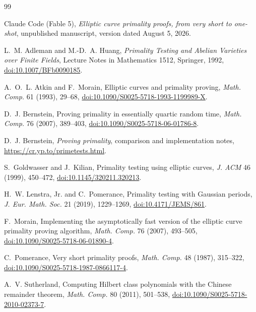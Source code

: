\documentclass[11pt]{amsart}
\begin{document}
\begin{thebibliography}{99}

Claude Code (Fable 5), \emph{Elliptic curve primality proofs, from very short to one-shot}, unpublished manuscript, version dated August 5, 2026.

L.~M. Adleman and M.-D.~A. Huang,
\emph{Primality Testing and Abelian Varieties over Finite Fields},
Lecture Notes in Mathematics 1512, Springer, 1992,
\href{https://doi.org/10.1007/BFb0090185}{doi:10.1007/BFb0090185}.

A.~O.~L. Atkin and F.~Morain,
Elliptic curves and primality proving,
\emph{Math. Comp.} 61 (1993), 29--68,
\href{https://doi.org/10.1090/S0025-5718-1993-1199989-X}{doi:10.1090/S0025-5718-1993-1199989-X}.

D.~J. Bernstein,
Proving primality in essentially quartic random time,
\emph{Math. Comp.} 76 (2007), 389--403,
\href{https://doi.org/10.1090/S0025-5718-06-01786-8}{doi:10.1090/S0025-5718-06-01786-8}.

D.~J. Bernstein,
\emph{Proving primality}, comparison and implementation notes,
\href{https://cr.yp.to/primetests.html}{https://cr.yp.to/primetests.html}.

S.~Goldwasser and J.~Kilian,
Primality testing using elliptic curves,
\emph{J. ACM} 46 (1999), 450--472,
\href{https://doi.org/10.1145/320211.320213}{doi:10.1145/320211.320213}.

H.~W. Lenstra, Jr. and C.~Pomerance,
Primality testing with Gaussian periods,
\emph{J. Eur. Math. Soc.} 21 (2019), 1229--1269,
\href{https://doi.org/10.4171/JEMS/861}{doi:10.4171/JEMS/861}.

F.~Morain,
Implementing the asymptotically fast version of the elliptic curve primality proving algorithm,
\emph{Math. Comp.} 76 (2007), 493--505,
\href{https://doi.org/10.1090/S0025-5718-06-01890-4}{doi:10.1090/S0025-5718-06-01890-4}.

C.~Pomerance,
Very short primality proofs,
\emph{Math. Comp.} 48 (1987), 315--322,
\href{https://doi.org/10.1090/S0025-5718-1987-0866117-4}{doi:10.1090/S0025-5718-1987-0866117-4}.

A.~V. Sutherland,
Computing Hilbert class polynomials with the Chinese remainder theorem,
\emph{Math. Comp.} 80 (2011), 501--538,
\href{https://doi.org/10.1090/S0025-5718-2010-02373-7}{doi:10.1090/S0025-5718-2010-02373-7}.


\end{thebibliography}
\end{document}

